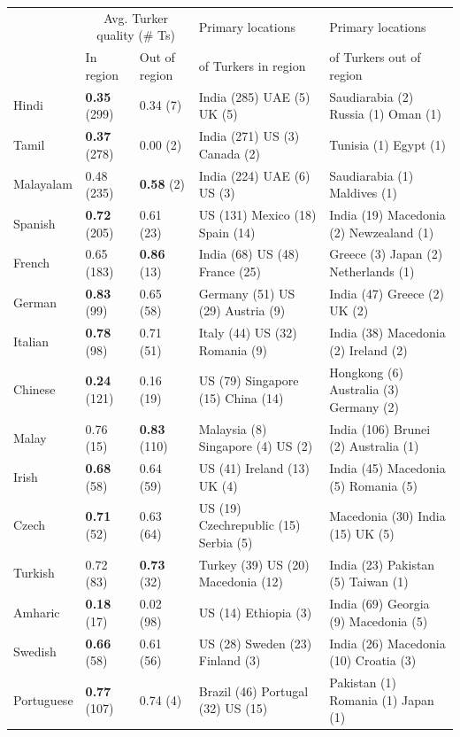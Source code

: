 \documentclass[11pt]{article}
\begin{document}
\begin{table}
\footnotesize
\begin{tabular}{lllll}
\hline\hline
&\multicolumn{2}{c}{Avg. Turker quality (\# Ts)}&Primary locations&Primary locations\\
&In region&Out of region&of Turkers in region&of Turkers out of region\\
\hline\hline
Hindi&\textbf{0.35} (299)&0.34 (7)&India (285) UAE (5) UK (5) &Saudiarabia (2) Russia (1) Oman (1) \\
Tamil&\textbf{0.37} (278)&0.00 (2)&India (271) US (3) Canada (2) &Tunisia (1) Egypt (1) \\
Malayalam&0.48 (235) &\textbf{0.58} (2)&India (224) UAE (6) US (3) &Saudiarabia (1) Maldives (1) \\
Spanish&\textbf{0.72} (205)&0.61 (23)&US (131) Mexico (18) Spain (14) &India (19) Macedonia (2) Newzealand (1) \\
French&0.65 (183) &\textbf{0.86} (13)&India (68) US (48) France (25) &Greece (3) Japan (2) Netherlands (1) \\
German&\textbf{0.83} (99)&0.65 (58)&Germany (51) US (29) Austria (9) &India (47) Greece (2) UK (2) \\
Italian&\textbf{0.78} (98)&0.71 (51)&Italy (44) US (32) Romania (9) &India (38) Macedonia (2) Ireland (2) \\
Chinese&\textbf{0.24} (121)&0.16 (19)&US (79) Singapore (15) China (14) &Hongkong (6) Australia (3) Germany (2) \\
Malay&0.76 (15) &\textbf{0.83} (110)&Malaysia (8) Singapore (4) US (2) &India (106) Brunei (2) Australia (1) \\
Irish&\textbf{0.68} (58)&0.64 (59)&US (41) Ireland (13) UK (4) &India (45) Macedonia (5) Romania (5) \\
Czech&\textbf{0.71} (52)&0.63 (64)&US (19) Czechrepublic (15) Serbia (5) &Macedonia (30) India (15) UK (5) \\
Turkish&0.72 (83) &\textbf{0.73} (32)&Turkey (39) US (20) Macedonia (12) &India (23) Pakistan (5) Taiwan (1) \\
Amharic&\textbf{0.18} (17)&0.02 (98)&US (14) Ethiopia (3) &India (69) Georgia (9) Macedonia (5) \\
Swedish&\textbf{0.66} (58)&0.61 (56)&US (28) Sweden (23) Finland (3) &India (26) Macedonia (10) Croatia (3) \\
Portuguese&\textbf{0.77} (107)&0.74 (4)&Brazil (46) Portugal (32) US (15) &Pakistan (1) Romania (1) Japan (1) \\

\end{tabular}
\end{table}
\end{document}
